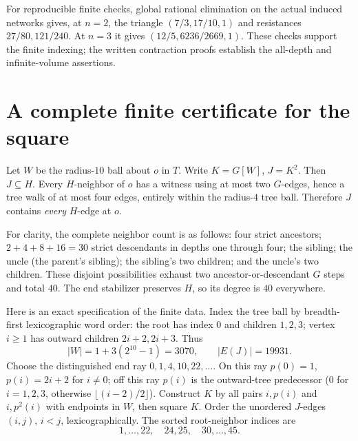 \documentclass[11pt]{article}
\theoremstyle{remark}\newtheorem{remark}[theorem]{Remark}
\begin{document}
For reproducible finite checks, global rational elimination on the actual
induced networks gives, at \(n=2\), the triangle
\((7/3,17/10,1)\) and resistances \(27/80,121/240\).
At \(n=3\) it gives \((12/5,6236/2669,1)\).
These checks support the finite indexing; the written contraction proofs
establish the all-depth and infinite-volume assertions.

\section{A complete finite certificate for the square}
Let \(W\) be the radius-\(10\) ball about \(o\) in \(T\).
Write \(K=G[W]\), \(J=K^2\). Then \(J\subseteq H\).
Every \(H\)-neighbor of \(o\) has a witness using at most two \(G\)-edges,
hence a tree walk of at most four edges, entirely within the radius-\(4\)
tree ball. Therefore \(J\) contains \emph{every} \(H\)-edge at \(o\).

For clarity, the complete neighbor count is as follows:
four strict ancestors; \(2+4+8+16=30\) strict descendants in depths
one through four; the sibling; the uncle (the parent's sibling);
the sibling's two children; and the uncle's two children.
These disjoint possibilities exhaust two ancestor-or-descendant \(G\)
steps and total \(40\). The end stabilizer preserves \(H\), so its degree
is \(40\) everywhere.

Here is an exact specification of the finite data.
Index the tree ball by breadth-first lexicographic word order:
the root has index \(0\) and children \(1,2,3\); vertex \(i\ge1\)
has outward children \(2i+2,2i+3\).
Thus
\[
 |W|=1+3(2^{10}-1)=3070,\qquad |E(J)|=19931.
\]
Choose the distinguished end ray \(0,1,4,10,22,\ldots\).
On this ray \(p(0)=1\), \(p(i)=2i+2\) for \(i\ne0\);
off this ray \(p(i)\) is the outward-tree predecessor
(\(0\) for \(i=1,2,3\), otherwise \(\lfloor(i-2)/2\rfloor\)).
Construct \(K\) by all pairs \(i,p(i)\) and \(i,p^2(i)\) with endpoints
in \(W\), then square \(K\).
Order the unordered \(J\)-edges \((i,j)\), \(i<j\), lexicographically.
The sorted root-neighbor indices are
\[
 1,\ldots,22,\quad24,25,\quad30,\ldots,45.
\]
\end{document}
